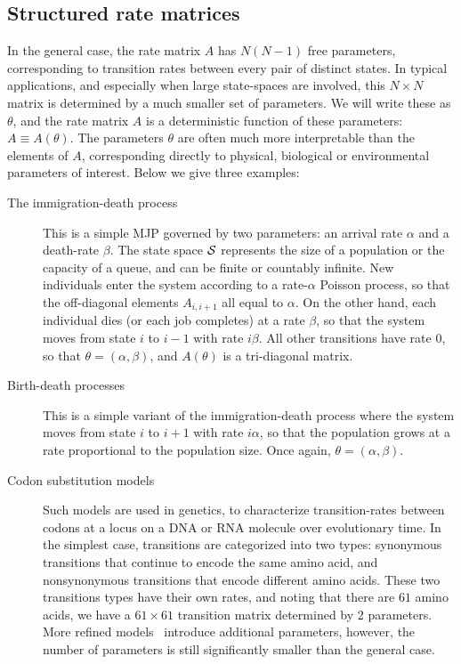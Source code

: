 \subsection{Structured rate matrices}
In the general case, the rate matrix $A$ has $N(N-1)$ free parameters,
corresponding to transition rates between every pair of distinct states. 
In typical applications, and especially when large state-spaces
are involved, this $N \times N$ matrix is determined by a much smaller
set of parameters. We will write these as $\theta$, and the rate 
matrix $A$ is a deterministic function of these parameters: 
$A \equiv A(\theta)$. The parameters $\theta$ are often much more 
interpretable than the elements of $A$, corresponding directly to
physical, biological or environmental parameters of interest. 
Below we give three examples:
\begin{description}
  \item[The immigration-death process] This is a simple MJP governed
    by two parameters: an arrival rate $\alpha$ and a death-rate
    $\beta$. The state space ${\mathcal S}$ represents the size of a 
    population or the capacity of a queue, and can be finite or
    countably infinite. New individuals
    enter the system according to a rate-$\alpha$ Poisson process,
    so that the off-diagonal elements $A_{i,i+1}$ all equal to $\alpha$.
    On the other hand, each individual dies (or each job completes) 
    at a rate $\beta$, so that the system moves from state $i$ to 
    $i-1$ with rate $i\beta$.
    All other transitions have rate $0$, so that $\theta = (\alpha,\beta)$,
    and $A(\theta)$ is a tri-diagonal matrix.
  \item[Birth-death processes] This is a simple variant of the
    immigration-death process where the system moves from state $i$ 
    to $i+1$ with rate $i\alpha$, so that the population grows at a 
    rate proportional to the population size. Once again, 
    $\theta=(\alpha,\beta)$.
  \item[Codon substitution models] Such models are used in genetics,
    to characterize transition-rates between codons at a locus on
    a DNA or RNA molecule over evolutionary time. In the simplest case,
    transitions are categorized into two types: synonymous transitions
    that continue to encode the same amino acid, and nonsynonymous 
    transitions that encode different amino acids. 
    These two transitions types have their own rates, and noting that 
    there are $61$ amino acids, we have a $61\times 61$ transition
    matrix determined by 2 parameters. More refined models~\cite[e.g.][]{goldman1994codon} introduce
    additional parameters, however, the number of parameters is still
    significantly smaller than the general case.
\end{description}
